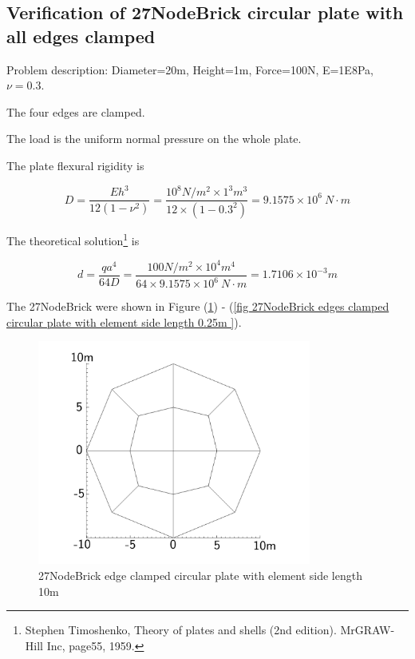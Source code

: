 \documentclass[fleqn,11pt]{article}
\begin{document}
\newpage
\subsection{Verification of 27NodeBrick circular plate with all edges clamped}

Problem description: Diameter=20m, Height=1m, Force=100N, E=1E8Pa, $\nu=0.3$. 

The four edges are clamped. 

The load is the uniform normal pressure on the whole plate. 


The plate flexural rigidity is 

\begin{equation}
  D=\frac{Eh^3}{12(1-\nu^2)}=\frac{10^8 N/m^2 \times 1^3 m^3 }{12 \times (1-0.3^2) }= 9.1575 \times 10^6 \ N\cdot m
\end{equation}

The theoretical solution\footnote{Stephen Timoshenko, Theory of plates and shells (2nd edition). MrGRAW-Hill Inc, page55, 1959.} is 

\begin{equation}
  d= \frac{q a^4}{64D}=\frac{100 N/m^2 \times 10^4 m^4}{64 \times 9.1575 \times 10^6 \ N\cdot m}=1.7106\times 10^{-3} m
\end{equation}

The 27NodeBrick were shown in Figure (\ref{fig 27NodeBrick edges clamped circular plate with element side length 10m }) - (\ref{fig 27NodeBrick edges clamped circular plate with element side length 0.25m }). 




\begin{figure}[H]
  \centering
  \includegraphics[width=9cm]{../Figure-files/circular_plate1.pdf}
  \caption{27NodeBrick edge clamped circular plate with element side length 10m }
  \label{fig 27NodeBrick edges clamped circular plate with element side length 10m }
\end{figure}
\end{document}
